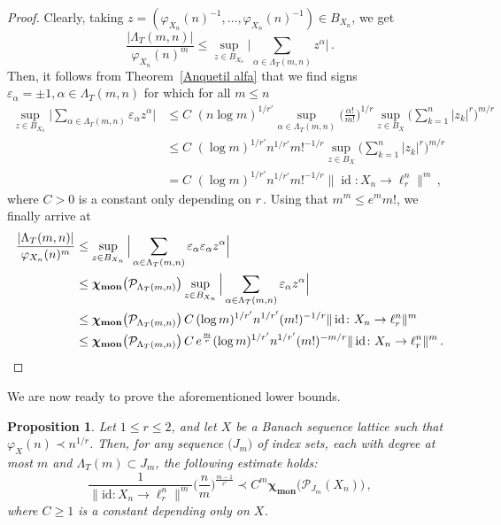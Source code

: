 \documentclass[12pt]{amsart}
\numberwithin{subsection}{section}
\newtheorem{proposition}[theorem]{Proposition}
\theoremstyle{definition}
\theoremstyle{remark}
\DeclareMathOperator{\mon}{mon}
\DeclareMathOperator{\id}{\mathrm{id}}
\newcommand{\chimon}{\chi_{\mon}}
\begin{document}
\begin{proof}
Clearly, taking $z = (\varphi_{X_n}(n)^{-1}, \ldots,\varphi_{X_n}(n)^{-1}) \in B_{X_n}$, we get
\[
\frac{|\Lambda_T(m,n)|}{\varphi_{X_n}(n)^m} \leq \sup_{z \in B_{X_n}} \Big| \sum_{\alpha \in \Lambda_T(m,n)} z^\alpha\Big|\,.
\]
Then, it follows from Theorem~\ref{Anquetil alfa} that we  find signs $\varepsilon_\alpha = \pm 1, \alpha \in \Lambda_T(m,n)$
for which for all  $m \leq n$
\begin{align*}
\sup_{z \in B_{X_n}} \Big| \sum_{\alpha \in \Lambda_T(m,n)} \varepsilon_\alpha  z^\alpha\Big|
& \leq C \,\,  (n \log m)^{1/r'} \sup_{\alpha \in \Lambda_T(m,n)} \Big(\frac{\alpha!}{m!}\Big)^{1/r}
\sup_{z \in B_X} \Big(\sum_{k=1}^n |z_k|^r\Big)^{m/r} \\
& \leq C \,\, (\log m)^{1/r'} n ^{1/r'}m!^{-1/r} \sup_{z \in B_X} \Big(\sum_{k=1}^n |z_k|^r\Big)^{m/r}   \nonumber\\
& =  C \,\, (\log m)^{1/r'} n ^{1/r'}m!^{-1/r} \|\id \colon X_n\to \ell_r^n\|^m\,,  \nonumber
\end{align*}
where $C >0$ is a constant only depending on $r$\,. Using  that $m^m \leq e^m m!$, we finally arrive at
\begin{align*}
\frac{|\Lambda_T(m,n)|}{\varphi_{X_n}(n)^m} & \leq
\sup_{z \in B_{X_n}} \Big| \sum_{\alpha \in  \Lambda_T(m,n)} \varepsilon_\alpha \varepsilon_\alpha z^\alpha \Big| \\
& \leq  \boldsymbol{\chimon} \big(\mathcal{P}_{ \Lambda_T(m,n)}\big)
\sup_{z \in B_{X_n}} \Big| \sum_{\alpha \in \Lambda_T(m,n)} \varepsilon_\alpha z^\alpha\Big| \\
& \leq \boldsymbol{\chimon} \big(\mathcal{P}_{\Lambda_T(m,n)}\big)
\,C\,(\log m)^{1/r'}n^{1/r'} (m!)^{-1/r}\|\id \colon X_n\to \ell_r^n\|^m \\
& \leq \boldsymbol{\chimon} \big(\mathcal{P}_{ \Lambda_T(m,n)}\big)
\,C\, e^{\frac{m}{r}}(\log m)^{1/r'} n^{1/r'} (m!)^{-m/r} \|\id \colon X_n \to \ell_r^n\|^{m}\,. \qedhere
\end{align*}
\end{proof}


We are now ready to prove the aforementioned lower bounds.


\begin{proposition} \label{innichen1}
Let $1 \leq r \leq 2$, and let $X$ be a Banach sequence lattice such that $\varphi_X(n)\prec n^{1/r}$. Then, for any
sequence $\big(J_m\big)$ of index sets, each with degree at most $m$ and $\Lambda_T(m) \subset J_m$, the following
estimate holds{\rm:}
\[
\frac{1}{\|\mathrm{id}\colon X_n\to \ell_r^n\|^m} \Big( \frac{n}{m} \Big)^{\frac{m-1}{r'}}
\prec C^{m} \boldsymbol{\chimon}\big(\mathcal{P}_{J_m}(X_n) \big)\,,
\]
where $C \ge 1$ is a constant depending only on $X$.
\end{proposition}
\end{document}
